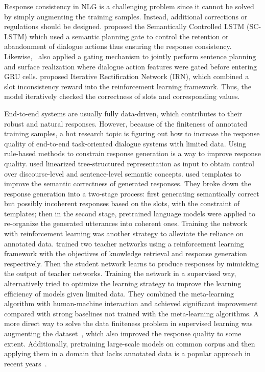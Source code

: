 Response consistency in NLG is a challenging problem since it cannot be solved by simply augmenting the training samples. Instead, additional corrections or regulations should be designed.  proposed the Semantically Controlled LSTM (SC-LSTM) which used a semantic planning gate to control the retention or abandonment of dialogue actions thus ensuring the response consistency. Likewise,~ also applied a gating mechanism to jointly perform sentence planning and surface realization where dialogue action features were gated before entering GRU cells.  proposed Iterative Rectification Network (IRN), which combined a slot inconsistency reward into the reinforcement learning framework. Thus, the model iteratively checked the correctness of slots and corresponding values.

End-to-end systems are usually fully data-driven, which contributes to their robust and natural responses. However, because of the finiteness of annotated training samples, a hot research topic is figuring out how to increase the response quality of end-to-end task-oriented dialogue systems with limited data. Using rule-based methods to constrain response generation is a way to improve response quality.  used linearized tree-structured representation as input to obtain control over discourse-level and sentence-level semantic concepts.  used templates to improve the semantic correctness of generated responses. They broke down the response generation into a two-stage process: first generating semantically correct but possibly incoherent responses based on the slots, with the constraint of templates; then in the second stage, pretrained language models were applied to re-organize the generated utterances into coherent ones. Training the network with reinforcement learning was another strategy to alleviate the reliance on annotated data.  trained two teacher networks using a reinforcement learning framework with the objectives of knowledge retrieval and response generation respectively. Then the student network learns to produce responses by mimicking the output of teacher networks. Training the network in a supervised way,~ alternatively tried to optimize the learning strategy to improve the learning efficiency of models given limited data. They combined the meta-learning algorithm with human-machine interaction and achieved significant improvement compared with strong baselines not trained with the meta-learning algorithms. A more direct way to solve the data finiteness problem in supervised learning was augmenting the dataset~, which also improved the response quality to some extent. Additionally, pretraining large-scale models on common corpus and then applying them in a domain that lacks annotated data is a popular approach in recent years~.

